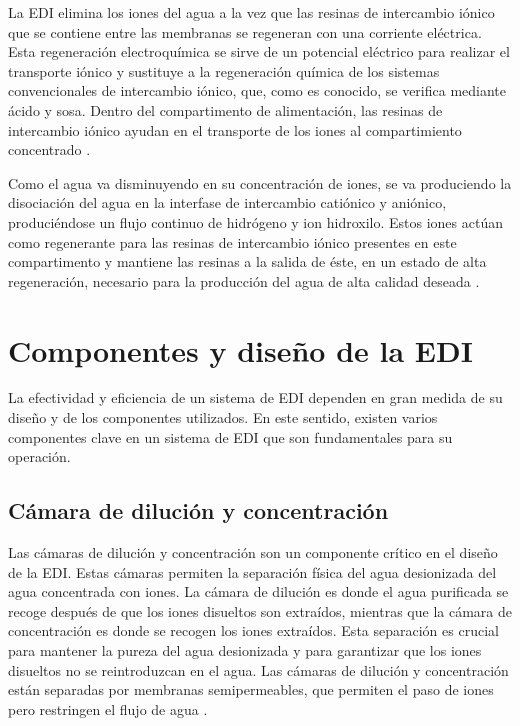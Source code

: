 
La EDI elimina los iones del agua a la vez que las resinas de intercambio iónico que se contiene entre las membranas se
regeneran con una corriente eléctrica. Esta regeneración electroquímica se sirve de un potencial eléctrico para realizar el
transporte iónico y sustituye a la regeneración química de los sistemas convencionales de intercambio iónico, que, como es conocido,
se verifica mediante ácido y sosa. Dentro del compartimento de alimentación, las resinas de intercambio iónico ayudan en el transporte de
los iones al compartimiento concentrado \cite{alvaradoElectrodeionizationPrinciplesStrategies2014}.

Como el agua va disminuyendo en su concentración de iones, se va produciendo la disociación del agua en la interfase de intercambio
catiónico y aniónico, produciéndose un flujo continuo de hidrógeno y ion hidroxilo. Estos iones actúan como regenerante para las resinas
de intercambio iónico presentes en este compartimento y mantiene las resinas a la salida de éste, en un estado de alta regeneración,
necesario para la producción del agua de alta calidad deseada \cite{alvaradoElectrodeionizationPrinciplesStrategies2014}.


\section{Componentes y diseño de la EDI}
La efectividad y eficiencia de un sistema de EDI dependen en gran medida de su diseño y de los componentes utilizados.
En este sentido, existen varios componentes clave en un sistema de EDI que son fundamentales para su operación.

\subsection{Cámara de dilución y concentración}
Las cámaras de dilución y concentración son un componente crítico en el diseño de la EDI. Estas cámaras permiten la separación
física del agua desionizada del agua concentrada con iones. La cámara de dilución es donde el agua purificada se recoge después
de que los iones disueltos son extraídos, mientras que la cámara de concentración es donde se recogen los iones extraídos.
Esta separación es crucial para mantener la pureza del agua desionizada y para garantizar que los iones disueltos no se
reintroduzcan en el agua. Las cámaras de dilución y concentración están separadas por membranas semipermeables, que permiten
el paso de iones pero restringen el flujo de agua \cite{rasSamplingPreconcentrationTechniques2009} \cite{ruiz-jimenezComparisonMultipleCalibration2020}.

